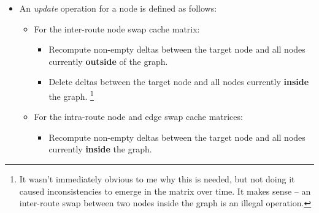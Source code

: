 \documentclass[14pt]{article}
\begin{document}
\begin{itemize}
\begin{itemize}
\begin{itemize}
					\item the neighboring nodes of the segment (two in total).%
						\footnote{I tried making it work with only 4 node
						updates for the segment endpoints, but it didn't work out.}
				\end{itemize}
		\end{itemize}
	\item An \emph{update} operation for a node is defined as follows:
		\begin{itemize}
			\item For the inter-route node swap cache matrix:
				\begin{itemize}
					\item Recompute non-empty deltas between the target node
						and all nodes currently \textbf{outside} of the graph.
				\end{itemize}
				\begin{itemize}
					\item Delete deltas between the target node and all nodes
						currently \textbf{inside} the graph.%
						\footnote{
							It wasn't immediately obvious to me why this is
							needed, but not doing it caused inconsistencies to
							emerge in the matrix over time. It makes sense --
							an inter-route swap between two nodes inside the
							graph is an illegal operation.
						}
				\end{itemize}
			\item For the intra-route node and edge swap cache matrices:
				\begin{itemize}
					\item Recompute non-empty deltas between the target node
						and all nodes currently \textbf{inside} the graph.
				\end{itemize}
		\end{itemize}
\end{itemize}

\newpage
\end{document}
